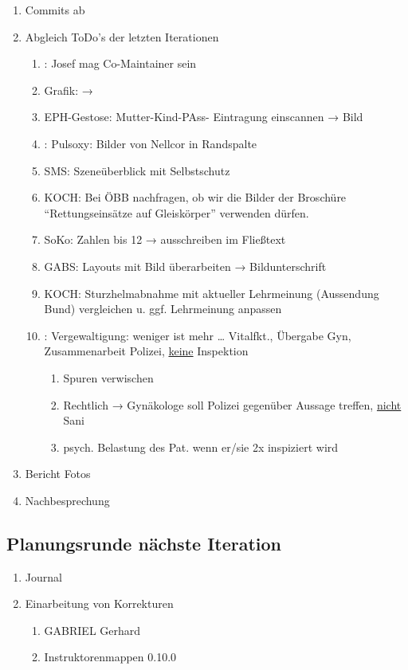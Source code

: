 \documentclass[
ngerman,
paper=a4,
fontsize=8pt,
headings=small,
draft=no,
parskip=half,
noonelinecaption
]{scrreprt}
\begin{document}
\begin{enumerate}
  \item Commits ab 
  \item Abgleich ToDo's der letzten Iterationen
  \begin{enumerate}
  \item {}: Josef mag Co-Maintainer sein
  \item Grafik:  → 
  \item EPH-Gestose: Mutter-Kind-PAss- Eintragung einscannen → Bild
  \item {}: Pulsoxy: Bilder von Nellcor in Randspalte
  \item SMS: Szeneüberblick mit Selbstschutz
  \item KOCH: Bei ÖBB nachfragen, ob wir die Bilder der Broschüre "`Rettungseinsätze auf Gleiskörper"' verwenden dürfen.
  \item SoKo: Zahlen bis 12 → ausschreiben im Fließtext
  \item GABS: Layouts mit Bild überarbeiten → Bildunterschrift
  \item KOCH: Sturzhelmabnahme mit aktueller Lehrmeinung (Aussendung Bund) vergleichen u. ggf. Lehrmeinung anpassen
  \item {}: Vergewaltigung: weniger ist mehr {\ldots} Vitalfkt., Übergabe Gyn, Zusammenarbeit Polizei, \underline{keine} Inspektion \begin{enumerate}
    \item Spuren verwischen
    \item Rechtlich → Gynäkologe soll Polizei gegenüber Aussage treffen, \underline{nicht} Sani
    \item psych. Belastung des Pat. wenn er/sie 2x inspiziert wird
  \end{enumerate}
\end{enumerate}
  \item Bericht Fotos
  \item Nachbesprechung
\end{enumerate}


\subsection{Planungsrunde nächste Iteration}

\begin{enumerate}
  \item Journal
  \item Einarbeitung von Korrekturen
  \begin{enumerate}
    \item GABRIEL Gerhard
    \item Instruktorenmappen 0.10.0
  \end{enumerate}
\end{enumerate}
\end{document}
